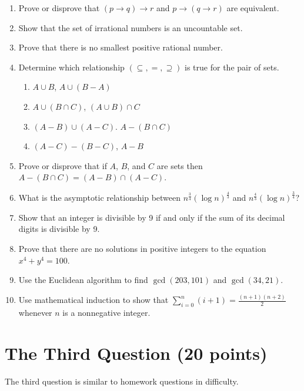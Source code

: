 \documentclass[letterpaper, 12pt]{article}
\begin{document}
\begin{enumerate}
    \item Prove or disprove that $(p \to q) \to r$ and $p \to (q \to r)$ are equivalent.
    \item Show that the set of irrational numbers is an uncountable set.
    \item Prove that there is no smallest positive rational number.
    \item Determine which relationship $(\subseteq, =, \supseteq)$ is true for the pair of sets.
    \begin{enumerate}
        \item $A \cup B$, $A \cup (B - A)$
        \item $A \cup (B \cap C)$, $(A \cup B) \cap C$
        \item $(A - B) \cup (A - C)$. $A - (B \cap C)$
        \item $(A - C) - (B - C)$, $A - B$
    \end{enumerate}
    \item Prove or disprove that if $A$, $B$, and $C$ are sets then $A - (B \cap C) = (A - B) \cap (A - C)$.
    \item What is the asymptotic relationship between $n^{\frac{3}{4}}(\log n)^{\frac{4}{3}}$ and $n^{\frac{4}{3}}(\log n)^{\frac{3}{4}}$?
    \item Show that an integer is divisible by 9 if and only if the sum of its decimal digits is divisible by 9.
    \item Prove that there are no solutions in positive integers to the equation $x^4 + y^4 = 100$.
    \item Use the Euclidean algorithm to find $\gcd(203, 101)$ and $\gcd(34, 21)$.
    \item Use mathematical induction to show that $\sum_{i=0}^{n} (i + 1) = \frac{(n + 1)(n + 2)}{2}$ whenever $n$ is a nonnegative integer.
\end{enumerate}

\section{The Third Question (20 points)}
The third question is similar to homework questions in difficulty.
\end{document}
